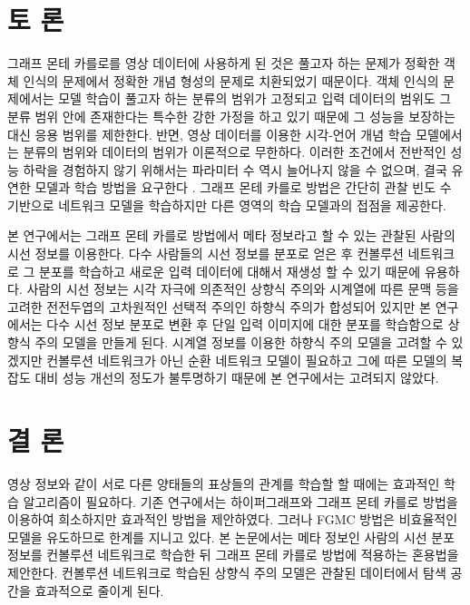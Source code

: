 \documentclass{kcc}
\begin{document}

\section{토 론}

그래프 몬테 카를로를 영상 데이터에 사용하게 된 것은 풀고자 하는 문제가 정확한 객체 인식의 문제에서 정확한 개념 형성의 문제로 치환되었기 때문이다. 객체 인식의 문제에서는 모델 학습이 풀고자 하는 분류의 범위가 고정되고 입력 데이터의 범위도 그 분류 범위 안에 존재한다는 특수한 강한 가정을 하고 있기 때문에 그 성능을 보장하는 대신 응용 범위를 제한한다. 반면, 영상 데이터를 이용한 시각-언어 개념 학습 모델에서는 분류의 범위와 데이터의 범위가 이론적으로 무한하다. 이러한 조건에서 전반적인 성능 하락을 경험하지 않기 위해서는 파라미터 수 역시 늘어나지 않을 수 없으며, 결국 유연한 모델과 학습 방법을 요구한다 \cite{zhang1994incremental}. 그래프 몬테 카를로 방법은 간단히 관찰 빈도 수 기반으로 네트워크 모델을 학습하지만 다른 영역의 학습 모델과의 접점을 제공한다.

본 연구에서는 그래프 몬테 카를로 방법에서 메타 정보라고 할 수 있는 관찰된 사람의 시선 정보를 이용한다. 다수 사람들의 시선 정보를 분포로 얻은 후 컨볼루션 네트워크로 그 분포를 학습하고 새로운 입력 데이터에 대해서 재생성 할 수 있기 때문에 유용하다. 사람의 시선 정보는 시각 자극에 의존적인 상향식 주의와 시계열에 따른 문맥 등을 고려한 전전두엽의 고차원적인 선택적 주의인 하향식 주의가 합성되어 있지만 본 연구에서는 다수 시선 정보 분포로 변환 후 단일 입력 이미지에 대한 분포를 학습함으로 상향식 주의 모델을 만들게 된다. 시계열 정보를 이용한 하향식 주의 모델을 고려할 수 있겠지만 컨볼루션 네트워크가 아닌 순환 네트워크 모델이 필요하고 그에 따른 모델의 복잡도 대비 성능 개선의 정도가 불투명하기 때문에 본 연구에서는 고려되지 않았다.

\section{결 론}

영상 정보와 같이 서로 다른 양태들의 표상들의 관계를 학습할 할 때에는 효과적인 학습 알고리즘이 필요하다. 기존 연구에서는 하이퍼그래프와 그래프 몬테 카를로 방법을 이용하여 희소하지만 효과적인 방법을 제안하였다. 그러나 FGMC 방법은 비효율적인 모델을 유도하므로 한계를 지니고 있다. 본 논문에서는 메타 정보인 사람의 시선 분포 정보를 컨볼루션 네트워크로 학습한 뒤 그래프 몬테 카를로 방법에 적용하는 혼용법을 제안한다. 컨볼루션 네트워크로 학습된 상향식 주의 모델은 관찰된 데이터에서 탐색 공간을 효과적으로 줄이게 된다. 




\end{document}
